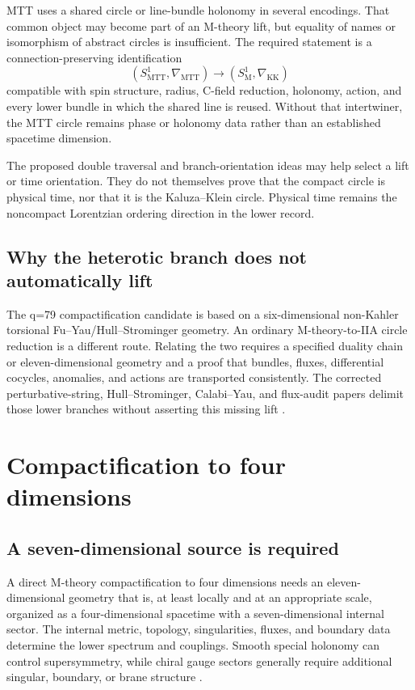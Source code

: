 \documentclass[11pt]{article}
\theoremstyle{definition}
\theoremstyle{remark}
\begin{document}
MTT uses a shared circle or line-bundle holonomy in several encodings.  That
common object may become part of an M-theory lift, but equality of names or
isomorphism of abstract circles is insufficient.  The required statement is
a connection-preserving identification
\[
(S^1_{\mathrm{MTT}},\nabla_{\mathrm{MTT}})
\longrightarrow
(S^1_{\mathrm{M}},\nabla_{\mathrm{KK}})
\]
compatible with spin structure, radius, C-field reduction, holonomy, action,
and every lower bundle in which the shared line is reused.  Without that
intertwiner, the MTT circle remains phase or holonomy data rather than an
established spacetime dimension.

The proposed double traversal and branch-orientation ideas may help select
a lift or time orientation.  They do not themselves prove that the compact
circle is physical time, nor that it is the Kaluza--Klein circle.  Physical
time remains the noncompact Lorentzian ordering direction in the lower
record.

\subsection{Why the heterotic branch does not automatically lift}

The q=79 compactification candidate is based on a six-dimensional
non-Kahler torsional Fu--Yau/Hull--Strominger geometry.  An ordinary
M-theory-to-IIA circle reduction is a different route.  Relating the two
requires a specified duality chain or eleven-dimensional geometry and a
proof that bundles, fluxes, differential cocycles, anomalies, and actions
are transported consistently.  The corrected perturbative-string,
Hull--Strominger, Calabi--Yau, and flux-audit papers delimit those lower
branches without asserting this missing lift
\cite{NeroString2026,NeroStrominger2026,NeroCalabiYau2026,NeroFluxAudit2026}.

\section{Compactification to four dimensions}
\label{sec:four}

\subsection{A seven-dimensional source is required}

A direct M-theory compactification to four dimensions needs an
eleven-dimensional geometry that is, at least locally and at an appropriate
scale, organized as a four-dimensional spacetime with a seven-dimensional
internal sector.  The internal metric, topology, singularities, fluxes, and
boundary data determine the lower spectrum and couplings.  Smooth special
holonomy can control supersymmetry, while chiral gauge sectors generally
require additional singular, boundary, or brane structure
\cite{AcharyaGukov2004}.
\end{document}
